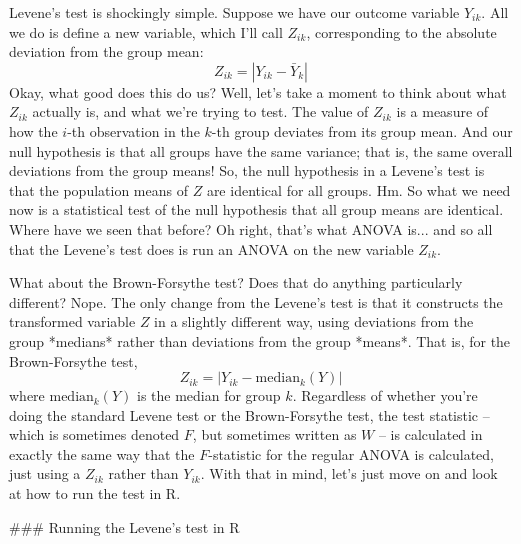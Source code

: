 Levene's test is shockingly simple. Suppose we have our outcome variable $Y_{ik}$. All we do is define a new variable, which I'll call $Z_{ik}$, corresponding to the absolute deviation from the group mean:
$$
Z_{ik} = \left| Y_{ik} - \bar{Y}_k \right|
$$
Okay, what good does this do us? Well, let's take a moment to think about what $Z_{ik}$ actually is, and what we're trying to test. The value of $Z_{ik}$ is a measure of how the $i$-th observation in the $k$-th group deviates from its group mean. And our null hypothesis is that all groups have the same variance; that is, the same overall deviations from the group means! So, the null hypothesis in a Levene's test is that the population means of $Z$ are identical for all groups. Hm. So what we need now is a statistical test of the null hypothesis that all group means are identical. Where have we seen that before? Oh right, that's what ANOVA is... and so all that the Levene's test does is run an ANOVA on the new variable $Z_{ik}$. 

What about the Brown-Forsythe test? Does that do anything particularly different? Nope. The only change from the Levene's test is that it constructs the transformed variable $Z$ in a slightly different way, using deviations from the group *medians* rather than deviations from the group *means*. That is, for the Brown-Forsythe test, 
$$
Z_{ik} = \left| Y_{ik} - \mbox{median}_k(Y) \right|
$$
where $\mbox{median}_k(Y)$ is the median for group $k$. Regardless of whether you're doing the standard Levene test or the Brown-Forsythe test, the test statistic -- which is sometimes denoted $F$, but sometimes written as $W$ -- is  calculated in exactly the same way that the $F$-statistic for the regular ANOVA is calculated, just using a $Z_{ik}$ rather than $Y_{ik}$. With that in mind, let's just move on and look at how to run the test in R.


### Running the Levene's test in R

